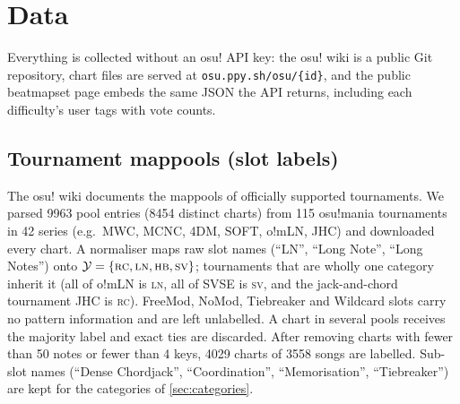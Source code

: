 \documentclass[10pt,twocolumn]{article}
\newcommand{\RC}{\textsc{rc}}
\newcommand{\LN}{\textsc{ln}}
\newcommand{\HB}{\textsc{hb}}
\newcommand{\SV}{\textsc{sv}}
\begin{document}
\section{Data}\label{sec:data}

Everything is collected without an osu! API key: the osu! wiki is a public Git repository, chart files are served at \texttt{osu.ppy.sh/osu/\{id\}}, and the public beatmapset page embeds the same JSON the API returns, including each difficulty's user tags with vote counts.

\subsection{Tournament mappools (slot labels)}\label{sec:pools}
The osu! wiki documents the mappools of officially supported tournaments. We parsed \num{9963} pool entries (\num{8454} distinct charts) from 115 osu!mania tournaments in 42 series (e.g.\ MWC, MCNC, 4DM, SOFT, o!mLN, JHC) and downloaded every chart. A normaliser maps raw slot names (``LN'', ``Long Note'', ``Long Notes'') onto $\mathcal{Y}=\{\RC,\LN,\HB,\SV\}$; tournaments that are wholly one category inherit it (all of o!mLN is \LN, all of SVSE is \SV, and the jack-and-chord tournament JHC is \RC). FreeMod, NoMod, Tiebreaker and Wildcard slots carry no pattern information and are left unlabelled. A chart in several pools receives the majority label and exact ties are discarded. After removing charts with fewer than 50 notes or fewer than 4 keys, \num{4029} charts of \num{3558} songs are labelled. Sub-slot names (``Dense Chordjack'', ``Coordination'', ``Memorisation'', ``Tiebreaker'') are kept for the categories of \cref{sec:categories}.
\end{document}
